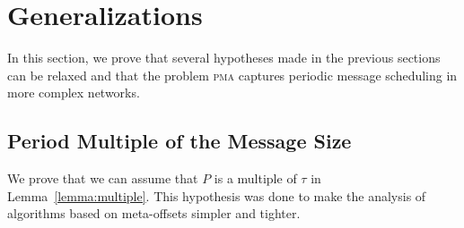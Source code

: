\documentclass[a4paper,UKenglish,cleveref, autoref, thm-restate]{lipics-v2019}
\newcommand\pma{\textsc{pma}\xspace}
\begin{document}
\section{Generalizations}\label{sec:gen}

In this section, we prove that several hypotheses made in the previous sections can be relaxed and that the problem \pma captures periodic message scheduling in more complex networks.

\subsection{Period Multiple of the Message Size}


We prove that we can assume that $P$ is a multiple of $\tau$ in Lemma~\ref{lemma:multiple}. This hypothesis was done to make the analysis of algorithms based on meta-offsets simpler and tighter. 
\end{document}

